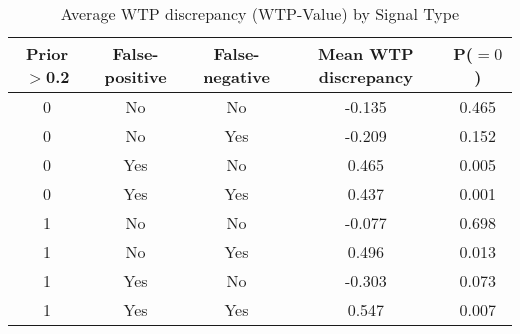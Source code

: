 \begin{table}[H]\centering \caption{Average WTP discrepancy (WTP-Value) by Signal Type} \begin{tabular}{ccccc} \hline \hline
\textbf{Prior$>$0.2}&\textbf{False-positive}&\textbf{False-negative}&\textbf{Mean WTP discrepancy}& \textbf{P($=0$)}\\ \hline
0&No&No&-0.135&0.465\\
0&No&Yes&-0.209&0.152\\
0&Yes&No&0.465&0.005\\
0&Yes&Yes&0.437&0.001\\
1&No&No&-0.077&0.698\\
1&No&Yes&0.496&0.013\\
1&Yes&No&-0.303&0.073\\
1&Yes&Yes&0.547&0.007\\
\hline \end{tabular} \end{table}
